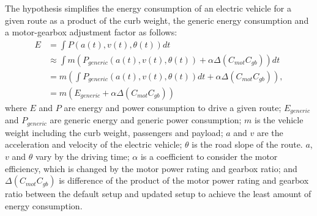 \documentclass[journal]{IEEEtran}
\begin{document}
The hypothesis simplifies the energy consumption of an electric vehicle for a given route as a product of the curb weight, the generic energy consumption and a motor-gearbox adjustment factor as follows:
 \begin{align} 
E 	&= \int P(a(t), v(t), \theta(t)) dt \nonumber \\  
	&\approx \int m (P_{generic}(a(t), v(t), \theta(t)) + \alpha \Delta (C_{mot}C_{gb})) dt\nonumber \\  
	&= m (\int P_{generic}(a(t), v(t), \theta(t)) dt + \alpha \Delta (C_{mot}C_{gb})), \nonumber \\
	&= m (E_{generic} + \alpha \Delta (C_{mot}C_{gb})) \nonumber
\end{align}
where $E$ and $P$ are energy and power consumption to drive a given route; $E_{generic}$ and $P_{generic}$ are generic energy and generic power consumption; $m$ is the vehicle weight including the curb weight, passengers and payload; $a$ and $v$ are the acceleration and velocity of the electric vehicle; $\theta$ is the road slope of the route. $a$, $v$ and $\theta$ vary by the driving time;
$\alpha$ is a coefficient to consider the motor efficiency, which is changed by the motor power rating and gearbox ratio; and $\Delta (C_{mot}C_{gb})$ is difference of the product of the motor power rating and gearbox ratio between the default setup and updated setup to achieve the least amount of energy consumption.

\end{document}
